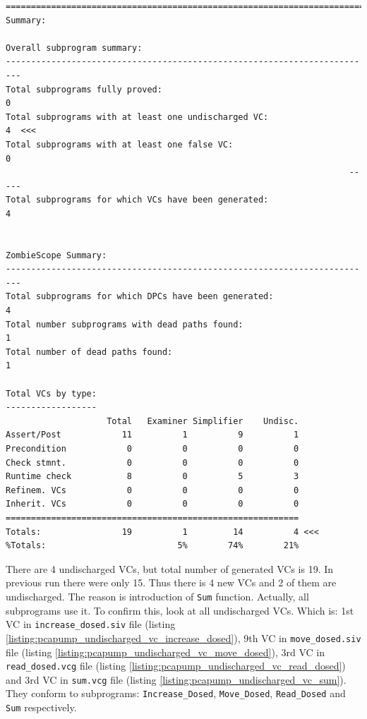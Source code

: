 \begin{lstlisting}[frame=single, gobble=0, caption={Third POGS report}, label={listing:pcapump_dosemonitor_pogs3}]
===============================================================================
Summary:

Overall subprogram summary:
-------------------------------------------------------------------------
Total subprograms fully proved:                                         0
Total subprograms with at least one undischarged VC:                    4  <<<
Total subprograms with at least one false VC:                           0
                                                                    -----
Total subprograms for which VCs have been generated:                    4


ZombieScope Summary:
-------------------------------------------------------------------------
Total subprograms for which DPCs have been generated:                   4
Total number subprograms with dead paths found:                         1
Total number of dead paths found:                                       1

Total VCs by type:
------------------
                    Total   Examiner Simplifier    Undisc.
Assert/Post            11          1          9          1
Precondition            0          0          0          0
Check stmnt.            0          0          0          0
Runtime check           8          0          5          3
Refinem. VCs            0          0          0          0
Inherit. VCs            0          0          0          0
==========================================================
Totals:                19          1         14          4 <<<
%Totals:                          5%        74%        21%
\end{lstlisting}
\doublespacing

There are 4 undischarged VCs, but total number of generated VCs is 19. In previous run there were only 15. Thus there is 4 new VCs and 2 of them are undischarged. The reason is introduction of \lstinline{Sum} function. Actually, all subprograms use it. To confirm this, look at all undischarged VCs. Which is: 1st VC in \lstinline{increase_dosed.siv} file (listing \ref{listing:pcapump_undischarged_vc_increase_dosed}), 9th VC in \lstinline{move_dosed.siv} file (listing \ref{listing:pcapump_undischarged_vc_move_dosed}), 3rd VC in \lstinline{read_dosed.vcg} file (listing \ref{listing:pcapump_undischarged_vc_read_dosed}) and 3rd VC in \lstinline{sum.vcg} file (listing \ref{listing:pcapump_undischarged_vc_sum}). They conform to subprograms: \lstinline{Increase_Dosed}, \lstinline{Move_Dosed}, \lstinline{Read_Dosed} and \lstinline{Sum} respectively.

